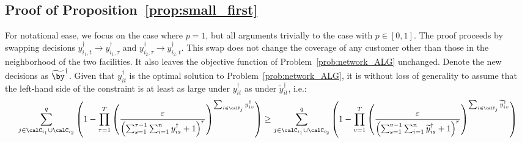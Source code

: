 \documentclass[blindrev]{informs3noheader}
\begin{document}
\subsection{Proof of Proposition~\ref{prop:small_first}}
\label{app:small_first}

For notational ease, we focus on the case where $p=1$, but all arguments trivially to the case with $p\in[0,1]$. The proof proceeds by swapping decisions $y^\dagger_{i_1,t} \to y^\dagger_{i_1,\tau}$ and $y^\dagger_{i_2,\tau} \to y^\dagger_{i_2,t}$. This swap does not change the coverage of any customer other than those in the neighborhood of the two facilities. It also leaves the objective function of Problem~\eqref{prob:network_ALG} unchanged. Denote the new decisions as $\widetilde{\by}^\dagger$. Given that $y^\dagger_{it}$ is the optimal solution to Problem~\eqref{prob:network_ALG}, it is without loss of generality to assume that the left-hand side of the constraint is at least as large under $y^\dagger_{it}$ as under $\widetilde{y}^\dagger_{it}$, i.e.:
\[\sum_{j \in \calC_{i_1} \cup \calC_{i_2}}^q \left(1-\prod_{\tau=1}^T \left(\frac{\varepsilon}{\left(\sum_{s=1}^{\tau-1} \sum_{i=1}^n y^\dagger_{is} +1\right)^r}\right)^{\sum_{i \in \calF_j} y^\dagger_{iv}}\right)\geq \sum_{j \in \calC_{i_1} \cup \calC_{i_2}}^q \left(1-\prod_{v=1}^T \left(\frac{\varepsilon}{\left(\sum_{s=1}^{v-1} \sum_{i=1}^n \widetilde{y}^\dagger_{is} +1\right)^r}\right)^{\sum_{i \in \calF_j} \widetilde{y}^\dagger_{iv}}\right)\]
\end{document}
